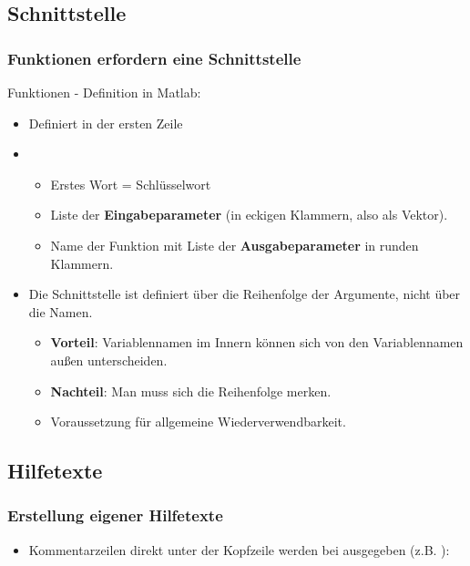   \subsection{Schnittstelle}
  \begin{frame}
      \frametitle{Funktionen erfordern eine Schnittstelle}
      Funktionen - Definition in Matlab:
      \begin{itemize}
        \item Definiert in der ersten Zeile
        \item {}
        \begin{itemize}
          \item Erstes Wort = Schlüsselwort 
          \item Liste der \textbf{Eingabeparameter} (in eckigen Klammern, also als Vektor).
          \item Name der Funktion mit Liste der \textbf{Ausgabeparameter} in runden Klammern.
        \end{itemize}
        \item Die Schnittstelle ist definiert über die Reihenfolge der Argumente, nicht über die Namen.
        \begin{itemize}
          \item \textbf{Vorteil}: Variablennamen im Innern können sich von den Variablennamen außen unterscheiden.
          \item \textbf{Nachteil}: Man muss sich die Reihenfolge merken.
          \item Voraussetzung für allgemeine Wiederverwendbarkeit.
        \end{itemize}
      \end{itemize}
  \end{frame}

  \subsection{Hilfetexte}
  \begin{frame}
      \frametitle{Erstellung eigener Hilfetexte}
      \begin{itemize}
        \item Kommentarzeilen direkt unter der Kopfzeile werden bei  ausgegeben
        (z.B. ):
        
      \end{itemize}
  \end{frame}


